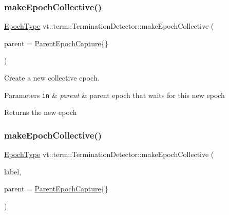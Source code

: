 \subsubsection{\texorpdfstring{make\+Epoch\+Collective()}{makeEpochCollective()}\hspace{0.1cm}{\footnotesize\ttfamily [1/2]}}
{\footnotesize\ttfamily \hyperlink{namespacevt_a985a5adf291c34a3ca263b3378388236}{Epoch\+Type} vt\+::term\+::\+Termination\+Detector\+::make\+Epoch\+Collective (\begin{DoxyParamCaption}\item[{\hyperlink{structvt_1_1term_1_1_parent_epoch_capture}{Parent\+Epoch\+Capture}}]{parent = {\ttfamily \hyperlink{structvt_1_1term_1_1_parent_epoch_capture}{Parent\+Epoch\+Capture}\{\}} }\end{DoxyParamCaption})}



Create a new collective epoch. 


\begin{DoxyParams}[1]{Parameters}
\mbox{\tt in}  & {\em parent} & parent epoch that waits for this new epoch\\
\hline
\end{DoxyParams}
\begin{DoxyReturn}{Returns}
the new epoch 
\end{DoxyReturn}
\mbox{\label{structvt_1_1term_1_1_termination_detector_a9da0ae37a148a0f6db83488cd44c19cb}} 
\subsubsection{\texorpdfstring{make\+Epoch\+Collective()}{makeEpochCollective()}\hspace{0.1cm}{\footnotesize\ttfamily [2/2]}}
{\footnotesize\ttfamily \hyperlink{namespacevt_a985a5adf291c34a3ca263b3378388236}{Epoch\+Type} vt\+::term\+::\+Termination\+Detector\+::make\+Epoch\+Collective (\begin{DoxyParamCaption}\item[{std\+::string const \&}]{label,  }\item[{\hyperlink{structvt_1_1term_1_1_parent_epoch_capture}{Parent\+Epoch\+Capture}}]{parent = {\ttfamily \hyperlink{structvt_1_1term_1_1_parent_epoch_capture}{Parent\+Epoch\+Capture}\{\}} }\end{DoxyParamCaption})}



